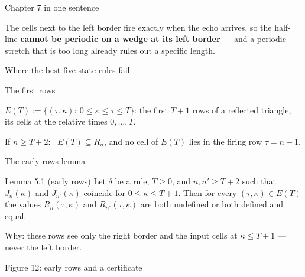 \begin{frame}{Chapter 7 in one sentence}
\vspace{4ex}
\begin{plainbox}\large
The cells next to the left border fire exactly when the echo arrives, so the half-line \textbf{cannot be periodic on a wedge at its left border} --- and a periodic stretch that is too long already rules out a specific length.
\end{plainbox}
\end{frame}


\begin{frame}{Where the best five-state rules fail}
\centering\fig[0.78]{}
\end{frame}

\begin{frame}{The first rows}
\vspace{3ex}
\begin{plainbox}
$E(T):=\{(\tau,\kappa):\ 0\le\kappa\le\tau\le T\}$: the first $T+1$ rows of a reflected triangle,\\ its cells at the relative times $0,\dots,T$.
\end{plainbox}
\vspace{2ex}
If $n\ge T+2$: \ $E(T)\subseteq R_n$, and no cell of $E(T)$ lies in the firing row $\tau=n-1$.
\end{frame}

\begin{frame}{The early rows lemma}
\vspace{2ex}
\begin{statement}{Lemma 5.1 (early rows)}
Let $\delta$ be a rule, $T\ge0$, and $n,n'\ge T+2$ such that $J_n(\kappa)$ and $J_{n'}(\kappa)$ coincide for $0\le\kappa\le T+1$. Then for every $(\tau,\kappa)\in E(T)$ the values $R_n(\tau,\kappa)$ and $R_{n'}(\tau,\kappa)$ are both undefined or both defined and equal.
\end{statement}
\vspace{1ex}
Why: these rows see only the right border and the input cells at $\kappa\le T+1$ --- never the left border.
\end{frame}

\begin{frame}{Figure 12: early rows and a certificate}
\centering\fig[0.78]{}
\end{frame}

